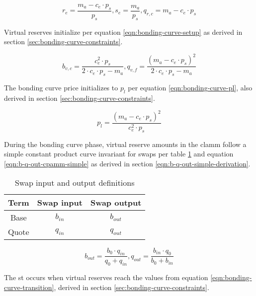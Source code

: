\documentclass[table, twocolumn]{article}
\begin{document}
\begin{equation} \label{eqn:supply-amounts}
  r_e = \frac{m_a - c_e \cdot p_s}{p_s},
  s_e = \frac{m_a}{p_s},
  q_{r, c} = m_a - c_e \cdot p_s
\end{equation}

Virtual reserves initialize per equation \ref{eqn:bonding-curve-setup} as derived in
section \ref{sec:bonding-curve-constraints}.

\begin{equation} \label{eqn:bonding-curve-setup}
  b_{v, c} = \frac{c_e ^ 2 \cdot p_s}{2 \cdot c_e \cdot p_s - m_a},
  q_{v, f} = \frac{(m_a - c_e \cdot p_s) ^ 2}{2 \cdot c_e \cdot p_s - m_a}
\end{equation}

The bonding curve price initializes to $p_l$ per equation \ref{eqn:bonding-curve-pl},
also derived in section \ref{sec:bonding-curve-constraints}.

\begin{equation} \label{eqn:bonding-curve-pl}
  p_l = \frac{(m_a - c_e \cdot p_s) ^ 2}{c_e ^ 2 \cdot p_s}
\end{equation}

During the bonding curve phase, virtual reserve amounts in the \gls*{clamm} follow a
simple constant product curve invariant for swaps per table \ref{tab:swap-in-out}
and equation \ref{eqn:b-q-out-cpamm-simple} as derived in section
\ref{eqn:b-q-out-simple-derivation}.

\begin{table}[!htb]
  \centering
  \begin{tabular}{|c|c|c|}
    \hline \rowcolor{blue}
    Term  & Swap input & Swap output \\ \hline
    Base  & $b_{in}$   & $b_{out}$   \\ \hline
    Quote & $q_{in}$   & $q_{out}$   \\ \hline
  \end{tabular}
  \caption{Swap input and output definitions}
  \label{tab:swap-in-out}
\end{table}

\begin{equation} \label{eqn:b-q-out-cpamm-simple}
  b_{out} = \frac{b_0 \cdot q_{in}}{q_0 + q_{in}},
  q_{out} = \frac{b_{in} \cdot q_0}{b_0 + b_{in}}
\end{equation}

The \gls*{st} occurs when virtual reserves reach the values from equation
\ref{eqn:bonding-curve-transition}, derived in section
\ref{sec:bonding-curve-constraints}.
\end{document}
